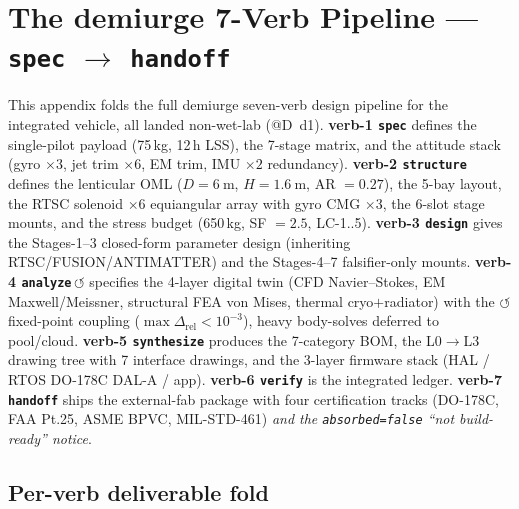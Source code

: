 \section{The demiurge 7-Verb Pipeline --- \texttt{spec} $\to$ \texttt{handoff}}
\label{app:verbs}

This appendix folds the full demiurge seven-verb design pipeline for the
integrated vehicle, all landed non-wet-lab (@D~d1). \textbf{verb-1
\texttt{spec}} defines the single-pilot payload (75\,kg, 12\,h LSS), the
7-stage matrix, and the attitude stack (gyro $\times3$, jet trim
$\times6$, EM trim, IMU $\times2$ redundancy). \textbf{verb-2
\texttt{structure}} defines the lenticular OML ($D\!=\!\SI{6}{\meter}$,
$H\!=\!\SI{1.6}{\meter}$, AR $=0.27$), the 5-bay layout, the RTSC
solenoid $\times6$ equiangular array with gyro CMG $\times3$, the 6-slot
stage mounts, and the stress budget (650\,kg, SF $=2.5$, LC-1..5).
\textbf{verb-3 \texttt{design}} gives the Stages-1--3 closed-form
parameter design (inheriting RTSC/FUSION/ANTIMATTER) and the Stages-4--7
falsifier-only mounts. \textbf{verb-4
\texttt{analyze}\,$\circlearrowleft$} specifies the 4-layer digital twin
(CFD Navier--Stokes, EM Maxwell/Meissner, structural FEA von Mises,
thermal cryo$+$radiator) with the $\circlearrowleft$ fixed-point coupling
($\max\Delta_{\text{rel}}\!<\!10^{-3}$), heavy body-solves deferred to
pool/cloud. \textbf{verb-5 \texttt{synthesize}} produces the 7-category
BOM, the L0$\to$L3 drawing tree with 7 interface drawings, and the
3-layer firmware stack (HAL / RTOS DO-178C DAL-A / app). \textbf{verb-6
\texttt{verify}} is the integrated ledger. \textbf{verb-7
\texttt{handoff}} ships the external-fab package with four certification
tracks (DO-178C, FAA Pt.25, ASME BPVC, MIL-STD-461) \emph{and the
\texttt{absorbed=false} ``not build-ready'' notice}.

\subsection{Per-verb deliverable fold}
\label{app:verbs-fold}


